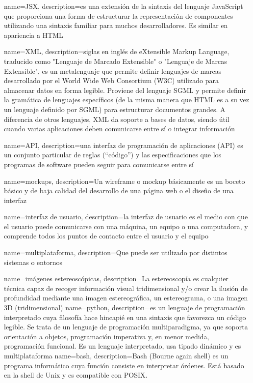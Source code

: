 
{
	name=JSX,
	description={es una extensión de la sintaxis del lenguaje JavaScript que proporciona una forma de estructurar la representación de componentes utilizando una sintaxis familiar para muchos desarrolladores. Es similar en apariencia a HTML} 
}

{
	name=XML,
	description={siglas en inglés de eXtensible Markup Language, traducido como "Lenguaje de Marcado Extensible" o "Lenguaje de Marcas Extensible", es un metalenguaje que permite definir lenguajes de marcas desarrollado por el World Wide Web Consortium (W3C) utilizado para almacenar datos en forma legible. Proviene del lenguaje SGML y permite definir la gramática de lenguajes específicos (de la misma manera que HTML es a su vez un lenguaje definido por SGML) para estructurar documentos grandes. A diferencia de otros lenguajes, XML da soporte a bases de datos, siendo útil cuando varias aplicaciones deben comunicarse entre sí o integrar información} 
}

{
	name=API,
	description={una interfaz de programación de aplicaciones (API) es un conjunto particular de reglas (``código'') y las especificaciones que los programas de software pueden seguir para comunicarse entre sí} 
}


{
	name=mockups,
	description={Un wireframe o mockup básicamente es un boceto básico y de baja calidad del desarrollo de una página web o el diseño de una interfaz} 
}

{
	name=interfaz de usuario,
	description={la interfaz de usuario es el medio con que el usuario puede comunicarse con una máquina, un equipo o una computadora, y comprende todos los puntos de contacto entre el usuario y el equipo} 
}

{
	name=multiplataforma,
	description={Que puede ser utilizado por distintos sistemas o entornos} 
}

{
	name=imágenes estereoscópicas,
	description={La estereoscopía es cualquier técnica capaz de recoger información visual tridimensional y/o crear la ilusión de profundidad mediante una imagen estereográfica, un estereograma, o una imagen \gls{3D} (tridimensional)} 
}
{
	name=python,
	description={es un lenguaje de programación interpretado cuya filosofía hace hincapié en una sintaxis que favorezca un código legible. Se trata de un lenguaje de programación multiparadigma, ya que soporta orientación a objetos, programación imperativa y, en menor medida, programación funcional. Es un lenguaje interpretado, usa tipado dinámico y es multiplataforma} 
} 
{
	name=bash,
	description={Bash (Bourne again shell) es un programa informático cuya función consiste en interpretar órdenes. Está basado en la shell de Unix y es compatible con POSIX.} 
} 

